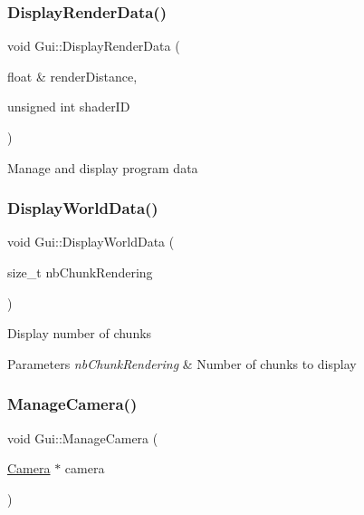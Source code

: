 \subsubsection{\texorpdfstring{Display\+Render\+Data()}{DisplayRenderData()}}
{\footnotesize\ttfamily void Gui\+::\+Display\+Render\+Data (\begin{DoxyParamCaption}\item[{float \&}]{render\+Distance,  }\item[{unsigned int}]{shader\+ID }\end{DoxyParamCaption})}



Manage and display program data 

\mbox{\label{class_gui_a31585d980883836e9139018d348508c7}} 
\subsubsection{\texorpdfstring{Display\+World\+Data()}{DisplayWorldData()}}
{\footnotesize\ttfamily void Gui\+::\+Display\+World\+Data (\begin{DoxyParamCaption}\item[{size\+\_\+t}]{nb\+Chunk\+Rendering }\end{DoxyParamCaption})}



Display number of chunks 


\begin{DoxyParams}{Parameters}
{\em nb\+Chunk\+Rendering} & Number of chunks to display\\
\hline
\end{DoxyParams}
\mbox{\label{class_gui_ac8c1da0d97fd585190830538a6ea432c}} 
\subsubsection{\texorpdfstring{Manage\+Camera()}{ManageCamera()}}
{\footnotesize\ttfamily void Gui\+::\+Manage\+Camera (\begin{DoxyParamCaption}\item[{\mbox{\hyperlink{class_camera}{Camera}} $\ast$}]{camera }\end{DoxyParamCaption})}



